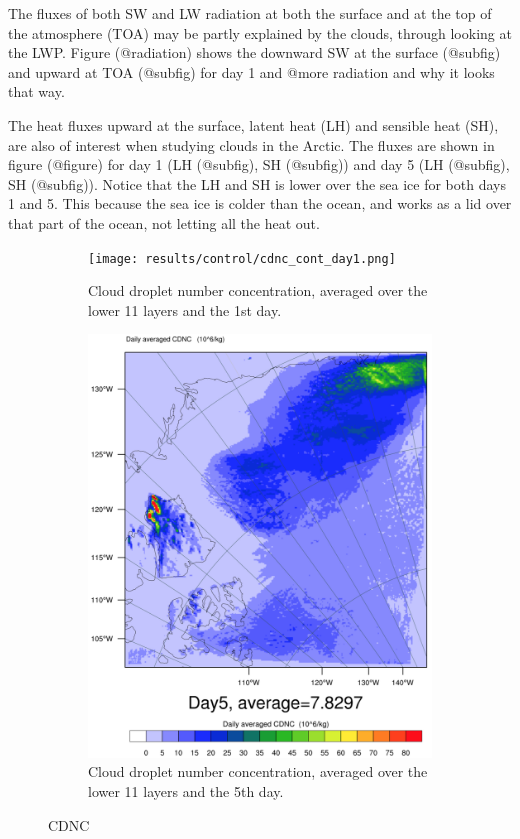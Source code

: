 The fluxes of both SW and LW radiation at both the surface and at the top of the atmosphere (TOA) may be partly explained by the clouds, through looking at the LWP. Figure (@radiation) shows the downward SW at the surface (@subfig) and upward at TOA (@subfig) for day 1 and @more radiation and why it looks that way.

The heat fluxes upward at the surface, latent heat (LH) and sensible heat (SH), are also of interest when studying clouds in the Arctic. The fluxes are shown in figure (@figure) for day 1 (LH (@subfig), SH (@subfig)) and day 5 (LH (@subfig), SH (@subfig)). Notice that the LH and SH is lower over the sea ice for both days 1 and 5. This because the sea ice is colder than the ocean, and works as a lid over that part of the ocean, not letting all the heat out.

\begin{figure}
	\begin{subfigure}{0.48\textwidth}
		\centering
		\texttt{[image: results/control/cdnc\_cont\_day1.png]}
		\caption{Cloud droplet number concentration, averaged over the lower 11 layers and the 1st day.}
		\label{subfig:cdnc_cont_Day1}
	\end{subfigure}
	\begin{subfigure}{0.48\textwidth}
		\centering
		\includegraphics[width=\textwidth]{results/control/cdnc_cont_day5.png}
		\caption{Cloud droplet number concentration, averaged over the lower 11 layers and the 5th day.}
		\label{subfig:cdnc_cont_Day5}
	\end{subfigure}
	\caption{CDNC}
	\label{fig:cdnc}
\end{figure}

